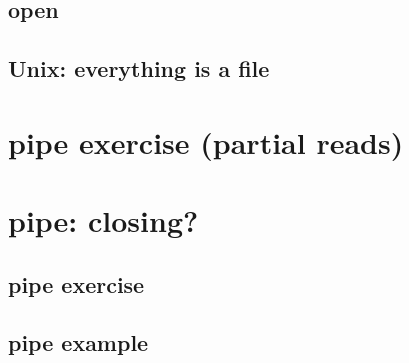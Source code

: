 

\subsection{open}



\subsection{Unix: everything is a file}



\section{pipe exercise (partial reads)}


\section{pipe: closing?}


\subsection{pipe exercise}


\subsection{pipe example}

